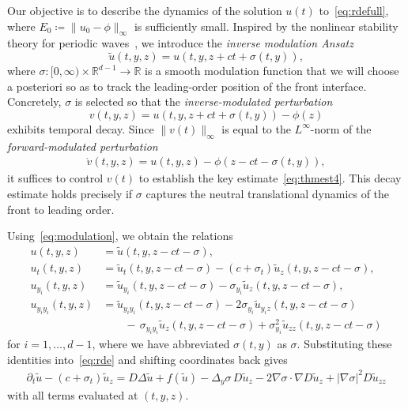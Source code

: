 \documentclass[12pt,oneside,a4paper,reqno]{amsart}
\numberwithin{equation}{section}
\theoremstyle{definition}
\theoremstyle{remark}
\newcommand{\bbR}{{\mathbb R}}
\begin{document}
Our objective is to describe the dynamics of the solution $u(t)$ to~\eqref{eq:rdefull}, where $E_0 \coloneq \|u_0 - \phi\|_\infty$ is sufficiently small.
Inspired by the nonlinear stability theory for periodic waves~\cite{Doelman_dynamics_2009,johnson_nonlinear_2011}, we introduce the \emph{inverse modulation Ansatz}
\begin{equation}
 	\label{eq:modulation}
	\tilde{u}(t,y,z) = u(t,y,z + ct + \sigma(t,y)),
\end{equation}
where $\sigma \colon [0,\infty) \times \bbR^{d-1} \to \bbR$ is a smooth modulation function that we will choose a posteriori so as to track the leading-order position of the front interface. Concretely, $\sigma$ is selected so that the \emph{inverse-modulated perturbation}
\begin{equation}
    \label{eq:vurel}
    v(t,y,z) = u(t,y,z + ct + \sigma(t,y)) - \phi(z)
\end{equation}
exhibits temporal decay. Since $\|v(t)\|_\infty$ is equal to the $L^\infty$-norm of the \emph{forward-modulated perturbation}
\begin{align*} 
\mathring{v}(t,y,z) = u(t,y,z) - \phi(z - ct - \sigma(t,y)),
\end{align*}
it suffices to control $v(t)$ to establish the key estimate~\eqref{eq:thmest4}. This decay estimate holds precisely if $\sigma$ captures the neutral translational dynamics of the front to leading order.

Using~\eqref{eq:modulation}, we obtain the relations
\begin{align*}
	u(t,y,z) &= \tilde{u}(t,y,z-ct-\sigma), \\
	u_t(t,y,z) &= \tilde{u}_t(t,y,z-ct-\sigma) - (c+\sigma_t)\tilde{u}_z(t,y,z-ct-\sigma), \\
	u_{y_i}(t,y,z) &= \tilde{u}_{y_i}(t,y,z-ct-\sigma) - \sigma_{y_i} \tilde{u}_z(t,y,z-ct-\sigma), \\
	u_{y_iy_i}(t,y,z) &= \tilde{u}_{y_iy_i}(t,y,z-ct-\sigma) - 2\sigma_{y_i} \tilde{u}_{y_iz}(t,y,z-ct-\sigma) \\
	&\qquad - \, \sigma_{y_iy_i}\tilde{u}_z(t,y,z-ct-\sigma) + \sigma_{y_i}^2 \tilde{u}_{zz}(t,y,z-ct-\sigma)
\end{align*}
for $i = 1,\ldots,d-1$, where we have abbreviated $\sigma(t,y)$ as $\sigma$. Substituting these identities into~\eqref{eq:rde} and shifting coordinates back gives
\begin{align}
	\label{eq:utildepde}
	\partial_t\tilde{u} - (c + \sigma_t)\tilde{u}_z
	= D\Delta \tilde{u} + f(\tilde{u})
    - \Delta_y \sigma\, D \tilde{u}_z
    - 2 \nabla \sigma \cdot \nabla D\tilde{u}_z
    + |\nabla \sigma|^2 D \tilde{u}_{zz}
\end{align}
with all terms evaluated at $(t,y,z)$.
\end{document}
